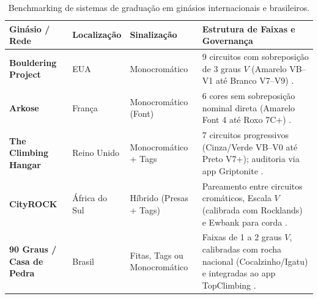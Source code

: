 \begin{table}[!htbp]
\centering
\caption{Benchmarking de sistemas de graduação em ginásios internacionais e brasileiros.}
\label{tab:benchmarking_gyms}
\footnotesize
\renewcommand{\arraystretch}{1.12}
\begin{tabularx}{\linewidth}{p{2.6cm}p{2.1cm}p{2.8cm}X}
\toprule
\textbf{Ginásio / Rede} & \textbf{Localização} & \textbf{Sinalização} & \textbf{Estrutura de Faixas e Governança} \\
\midrule
\textbf{Bouldering Project} & EUA & Monocromático & 9 circuitos com sobreposição de 3 graus $V$ (Amarelo VB--V1 até Branco V7--V9) \cite{bp_grades, gearloop_tempe}. \\
\rowcolor{rowgray}
\textbf{Arkose} & França & Monocromático (Font) & 6 cores sem sobreposição nominal direta (Amarelo Font 4 até Roxo 7C+) \cite{arkose_niveaux}. \\
\textbf{The Climbing Hangar} & Reino Unido & Monocromático + Tags & 7 circuitos progressivos (Cinza/Verde VB--V0 até Preto V7+); auditoria via app Griptonite \cite{bmc_grades, reddit_hangar}. \\
\rowcolor{rowgray}
\textbf{CityROCK} & África do Sul & Híbrido (Presas + Tags) & Pareamento entre circuitos cromáticos, Escala $V$ (calibrada com Rocklands) e Ewbank para corda \cite{cityrock_guide}. \\
\textbf{90 Graus / Casa de Pedra} & Brasil & Fitas, Tags ou Monocromático & Faixas de 1 a 2 graus $V$, calibradas com rocha nacional (Cocalzinho/Igatu) e integradas ao app TopClimbing \cite{topclimbing_platform, aventura_retrato}. \\
\bottomrule
\end{tabularx}
\end{table}

